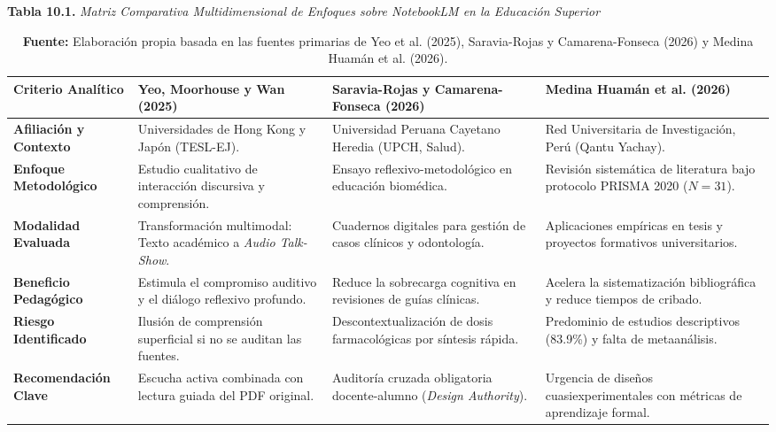 \vspace{0.4cm}
\begin{table}[htpb!]
\centering
\small
\textbf{Tabla 10.1.} \textit{Matriz Comparativa Multidimensional de Enfoques sobre NotebookLM en la Educación Superior}\\[0.25cm]
\footnotesize
\renewcommand{\arraystretch}{1.4}
\begin{tabularx}{\textwidth}{>{\raggedright\arraybackslash\bfseries}p{2.6cm} >{\raggedright\arraybackslash}X >{\raggedright\arraybackslash}X >{\raggedright\arraybackslash}X}
\toprule
Criterio Analítico & \textbf{Yeo, Moorhouse y Wan (2025)} & \textbf{Saravia-Rojas y Camarena-Fonseca (2026)} & \textbf{Medina Huamán et al. (2026)} \\
\midrule
Afiliación y Contexto & Universidades de Hong Kong y Japón (TESL-EJ). & Universidad Peruana Cayetano Heredia (UPCH, Salud). & Red Universitaria de Investigación, Perú (Qantu Yachay). \\
Enfoque Metodológico & Estudio cualitativo de interacción discursiva y comprensión. & Ensayo reflexivo-metodológico en educación biomédica. & Revisión sistemática de literatura bajo protocolo PRISMA 2020 ($N=31$). \\
Modalidad Evaluada & Transformación multimodal: Texto académico a \textit{Audio Talk-Show}. & Cuadernos digitales para gestión de casos clínicos y odontología. & Aplicaciones empíricas en tesis y proyectos formativos universitarios. \\
Beneficio Pedagógico & Estimula el compromiso auditivo y el diálogo reflexivo profundo. & Reduce la sobrecarga cognitiva en revisiones de guías clínicas. & Acelera la sistematización bibliográfica y reduce tiempos de cribado. \\
Riesgo Identificado & Ilusión de comprensión superficial si no se auditan las fuentes. & Descontextualización de dosis farmacológicas por síntesis rápida. & Predominio de estudios descriptivos (83.9\%) y falta de metaanálisis. \\
Recomendación Clave & Escucha activa combinada con lectura guiada del PDF original. & Auditoría cruzada obligatoria docente-alumno (\textit{Design Authority}). & Urgencia de diseños cuasiexperimentales con métricas de aprendizaje formal. \\
\bottomrule
\end{tabularx}
\caption*{\scriptsize \textbf{Fuente:} Elaboración propia basada en las fuentes primarias de Yeo et al. (2025), Saravia-Rojas y Camarena-Fonseca (2026) y Medina Huamán et al. (2026).}
\end{table}

